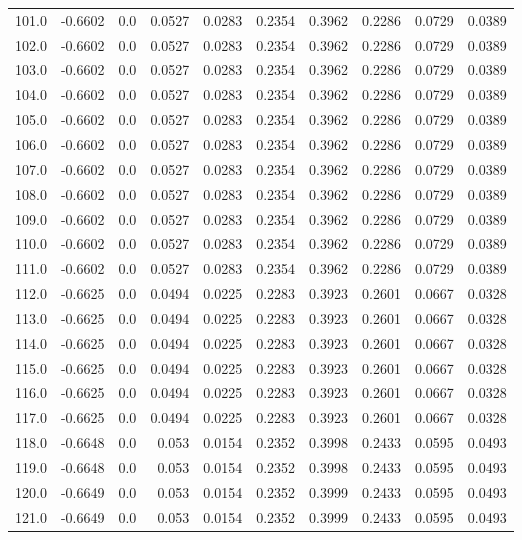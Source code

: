 \begin{longtable}{lrrrrrrrrr}
101.0 & -0.6602 & 0.0 & 0.0527 & 0.0283 & 0.2354 & 0.3962 & 0.2286 & 0.0729 & 0.0389 \\
102.0 & -0.6602 & 0.0 & 0.0527 & 0.0283 & 0.2354 & 0.3962 & 0.2286 & 0.0729 & 0.0389 \\
103.0 & -0.6602 & 0.0 & 0.0527 & 0.0283 & 0.2354 & 0.3962 & 0.2286 & 0.0729 & 0.0389 \\
104.0 & -0.6602 & 0.0 & 0.0527 & 0.0283 & 0.2354 & 0.3962 & 0.2286 & 0.0729 & 0.0389 \\
105.0 & -0.6602 & 0.0 & 0.0527 & 0.0283 & 0.2354 & 0.3962 & 0.2286 & 0.0729 & 0.0389 \\
106.0 & -0.6602 & 0.0 & 0.0527 & 0.0283 & 0.2354 & 0.3962 & 0.2286 & 0.0729 & 0.0389 \\
107.0 & -0.6602 & 0.0 & 0.0527 & 0.0283 & 0.2354 & 0.3962 & 0.2286 & 0.0729 & 0.0389 \\
108.0 & -0.6602 & 0.0 & 0.0527 & 0.0283 & 0.2354 & 0.3962 & 0.2286 & 0.0729 & 0.0389 \\
109.0 & -0.6602 & 0.0 & 0.0527 & 0.0283 & 0.2354 & 0.3962 & 0.2286 & 0.0729 & 0.0389 \\
110.0 & -0.6602 & 0.0 & 0.0527 & 0.0283 & 0.2354 & 0.3962 & 0.2286 & 0.0729 & 0.0389 \\
111.0 & -0.6602 & 0.0 & 0.0527 & 0.0283 & 0.2354 & 0.3962 & 0.2286 & 0.0729 & 0.0389 \\
112.0 & -0.6625 & 0.0 & 0.0494 & 0.0225 & 0.2283 & 0.3923 & 0.2601 & 0.0667 & 0.0328 \\
113.0 & -0.6625 & 0.0 & 0.0494 & 0.0225 & 0.2283 & 0.3923 & 0.2601 & 0.0667 & 0.0328 \\
114.0 & -0.6625 & 0.0 & 0.0494 & 0.0225 & 0.2283 & 0.3923 & 0.2601 & 0.0667 & 0.0328 \\
115.0 & -0.6625 & 0.0 & 0.0494 & 0.0225 & 0.2283 & 0.3923 & 0.2601 & 0.0667 & 0.0328 \\
116.0 & -0.6625 & 0.0 & 0.0494 & 0.0225 & 0.2283 & 0.3923 & 0.2601 & 0.0667 & 0.0328 \\
117.0 & -0.6625 & 0.0 & 0.0494 & 0.0225 & 0.2283 & 0.3923 & 0.2601 & 0.0667 & 0.0328 \\
118.0 & -0.6648 & 0.0 & 0.053 & 0.0154 & 0.2352 & 0.3998 & 0.2433 & 0.0595 & 0.0493 \\
119.0 & -0.6648 & 0.0 & 0.053 & 0.0154 & 0.2352 & 0.3998 & 0.2433 & 0.0595 & 0.0493 \\
120.0 & -0.6649 & 0.0 & 0.053 & 0.0154 & 0.2352 & 0.3999 & 0.2433 & 0.0595 & 0.0493 \\
121.0 & -0.6649 & 0.0 & 0.053 & 0.0154 & 0.2352 & 0.3999 & 0.2433 & 0.0595 & 0.0493 \\

\end{longtable}
